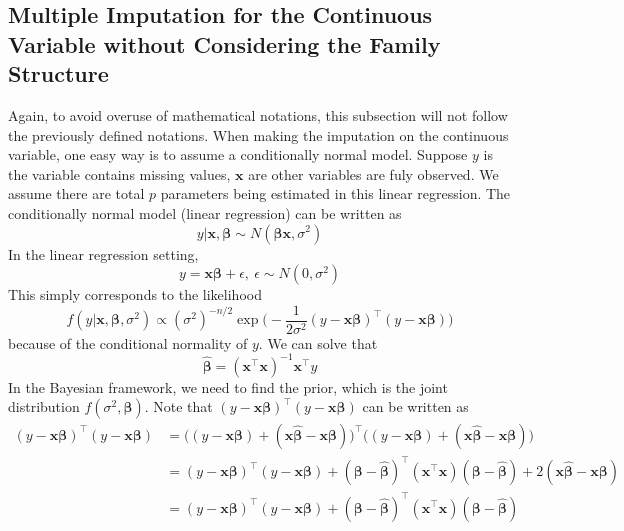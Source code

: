 \documentclass[preprint,12pt]{elsarticle}
\begin{document}
\subsection{Multiple Imputation for the Continuous Variable without Considering the Family Structure}
Again, to avoid overuse of mathematical notations, this subsection will not follow the previously defined notations. 
When making the imputation on the continuous variable, one easy way is to assume a conditionally normal model. 
Suppose $y$ is the variable contains missing values, $\mathbf{x}$ are other variables are fuly observed. 
We assume there are total $p$ parameters being estimated in this linear regression. 
The conditionally normal model (linear regression) can be written as 
\begin{equation} 
    y|\mathbf{x},\boldsymbol{\beta}\sim N(\boldsymbol{\beta}\mathbf{x}, \sigma^2)
\end{equation}
In the linear regression setting, 
\begin{equation} 
    y=\mathbf{x}\boldsymbol{\beta}+\epsilon,~ \epsilon\sim N(0, \sigma^2)
\end{equation}
This simply corresponds to the likelihood 
\begin{equation}\label{eq:bayeslinearnormal}
    f(y|\mathbf{x}, \boldsymbol{\beta}, \sigma^2)\propto (\sigma^2)^{-n/2}\exp \Big (-\frac{1}{2\sigma^2} (y-\mathbf{x}\boldsymbol{\beta})^{\top}(y-\mathbf{x}\boldsymbol{\beta})\Big )
\end{equation}
because of the conditional normality of $y$. 
We can solve that 
\begin{equation} 
    \hat{\boldsymbol{\beta}}=(\mathbf{x}^{\top}\mathbf{x})^{-1}\mathbf{x}^{\top}y
\end{equation}
In the Bayesian framework, we need to find the prior, which is the joint distribution $f(\sigma^2,\boldsymbol{\beta})$. 
Note that $(y-\mathbf{x}\boldsymbol{\beta})^{\top}(y-\mathbf{x}\boldsymbol{\beta})$ can be written as 
\begin{align} 
    (y-\mathbf{x}\boldsymbol{\beta})^{\top}(y-\mathbf{x}\boldsymbol{\beta})&=\big ((y-\mathbf{x}\boldsymbol{\beta})+(\mathbf{x}\hat{\boldsymbol{\beta}}-\mathbf{x}\boldsymbol{\beta})\big )^{\top}\big ((y-\mathbf{x}\boldsymbol{\beta})+(\mathbf{x}\hat{\boldsymbol{\beta}}-\mathbf{x}\boldsymbol{\beta})\big )\\
    &=(y-\mathbf{x}\boldsymbol{\beta})^{\top}(y-\mathbf{x}\boldsymbol{\beta}) + (\boldsymbol{\beta}-\hat{\boldsymbol{\beta}})^{\top}(\mathbf{x}^{\top}\mathbf{x})(\boldsymbol{\beta}-\hat{\boldsymbol{\beta}})+2(\mathbf{x}\hat{\boldsymbol{\beta}}-\mathbf{x}\boldsymbol{\beta})\\
    &=(y-\mathbf{x}\boldsymbol{\beta})^{\top}(y-\mathbf{x}\boldsymbol{\beta}) + (\boldsymbol{\beta}-\hat{\boldsymbol{\beta}})^{\top}(\mathbf{x}^{\top}\mathbf{x})(\boldsymbol{\beta}-\hat{\boldsymbol{\beta}})
\end{align}
\end{document}
